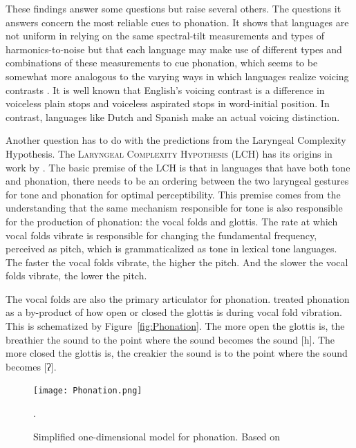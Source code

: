 \documentclass[12pt, letterpaper]{article}
\begin{document}
These findings answer some questions but raise several others. The questions it answers concern the most reliable cues to phonation. It shows that languages are not uniform in relying on the same spectral-tilt measurements and types of harmonics-to-noise but that each language may make use of different types and combinations of these measurements to cue phonation, which seems to be somewhat more analogous to the varying ways in which languages realize voicing contrasts \citep{liskerCrossLanguageStudyVoicing1964}. It is well known that English's voicing contrast is a difference in voiceless plain stops and voiceless aspirated stops in word-initial position. In contrast, languages like Dutch and Spanish make an actual voicing distinction. 

Another question has to do with the predictions from the Laryngeal Complexity Hypothesis. The \textsc{Laryngeal Complexity Hypothesis} (LCH) has its origins in work by \citet{silvermanLaryngealComplexityOtomanguean1997,blankenshipTimeCourseBreathiness1997,blankenshipTimingNonmodalPhonation2002}. The basic premise of the LCH is that in languages that have both tone and phonation, there needs to be an ordering between the two laryngeal gestures for tone and phonation for optimal perceptibility. This premise comes from the understanding that the same mechanism responsible for tone is also responsible for the production of phonation: the vocal folds and glottis. The rate at which vocal folds vibrate is responsible for changing the fundamental frequency, perceived as pitch, which is grammaticalized as tone in lexical tone languages. The faster the vocal folds vibrate, the higher the pitch. And the slower the vocal folds vibrate, the lower the pitch. 

The vocal folds are also the primary articulator for phonation. \citet{ladefogedPreliminariesLinguisticPhonetics1971,gordonPhonationTypesCrosslinguistic2001} treated phonation as a by-product of how open or closed the glottis is during vocal fold vibration. This is schematized by Figure~\ref{fig:Phonation}. The more open the glottis is, the breathier the sound to the point where the sound becomes the sound [h]. The more closed the glottis is, the creakier the sound is to the point where the sound becomes [ʔ]. 

\begin{figure}[!ht]
	\centering
	\texttt{[image: Phonation.png]}
	\caption{Simplified one-dimensional model for phonation. Based on \citet{ladefogedPreliminariesLinguisticPhonetics1971,gordonPhonationTypesCrosslinguistic2001}}.
	\label{fig:Phonation2}
\end{figure}
\end{document}
